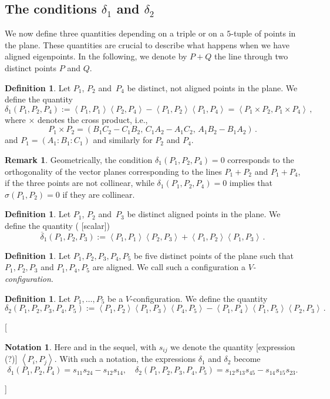 \documentclass{amsart}
\theoremstyle{plain}
\theoremstyle{definition}
\newtheorem{definition}[lemma]{Definition}
\newtheorem*{notation}{Notation}
\newtheorem{rmk}[lemma]{Remark}
\newcommand{\scl}[2]{\left\langle {#1}, {#2} \right\rangle}
\newcommand{\blue}[1]{{\color{blue}  [#1]}}
\begin{document}
\subsection{The conditions $\delta_1$ and $\delta_2$}

We now define three quantities depending on a triple or on a $5$-tuple of points in the plane.
These quantities are crucial to describe what happens when we have aligned eigenpoints.
In the following, we denote by $P + Q$ the line through two distinct points $P$ and $Q$.

\begin{definition}
\label{definition:delta1}
 Let $P_1$, $P_2$ and~$P_4$ be distinct, not aligned points in the plane.
 We define the quantity
 \[
  \delta_1(P_1, P_2, P_4) :=
  \scl{P_1}{P_1} \scl{P_2}{P_4} - \scl{P_1}{P_2}\scl{P_1}{P_4}
  =
  \scl{P_1\times P_2}{P_1 \times P_4} \,,
 \]
 where $\times$ denotes the cross product, i.e.,
 \[
  P_1 \times P_2 = (B_1 C_2 - C_1 B_2, \, C_1 A_2 - A_1 C_2, \, A_1 B_2 - B_1 A_2) \,.
 \]
 and $P_1 = (A_1: B_1: C_1)$ and similarly for $P_2$ and $P_4$.
\end{definition}

\begin{rmk}\label{rmk: significato di delta1}
 Geometrically, the condition $\delta_1(P_1, P_2, P_4) = 0$ corresponds to the orthogonality of the vector planes corresponding to the lines $P_1 + P_2$ and $P_1 + P_4$, if the three points are not collinear, while
 $\delta_1(P_1, P_2, P_4) = 0$ implies that $\sigma (P_1,P_2)=0$ if they are collinear.
\end{rmk}


\begin{definition}
\label{definition:delta1b}
 Let $P_1$, $P_2$ and~$P_3$ be distinct aligned points in the plane.
 We define the quantity (\blue{scalar})
 \[
  \overline{\delta}_1(P_1, P_2, P_3) :=
  \scl{P_1}{P_1} \scl{P_2}{P_3} + \scl{P_1}{P_2}\scl{P_1}{P_3} \,.
  \]
\end{definition}

\begin{definition}
\label{Vconf}
Let $P_1, P_2, P_3, P_4, P_5$ be five distinct points of the plane
such that $P_1, P_2, P_3$ and $P_1, P_4, P_5$ are aligned.
We call such a configuration a \emph{$V$-configuration}.
\end{definition}


\begin{definition}
 Let $P_1, \dots, P_5$ be a $V$-configuration.
We define the quantity
 \[
  \delta_2(P_1, P_2, P_3, P_4, P_5) :=
  \scl{P_1}{P_2} \scl{P_1}{P_3} \scl{P_4}{P_5} -
  \scl{P_1}{P_4} \scl{P_1}{P_5} \scl{P_2}{P_3} \,.
 \]
\end{definition}
\blue{
\begin{notation}
   Here and in the sequel, with $s_{ij}$ we denote the quantity \blue{expression (?)} $\scl{P_i}{P_j}$.
With such a notation, the expressions $\delta_1$ and $\delta_2$ become
$$
\delta_1(P_1, P_2, P_4) = s_{11} s_{24}-s_{12}s_{14},
\quad \delta_2(P_1, P_2, P_3, P_4, P_5) =s_{12}s_{13}s_{45}-s_{14}s_{15} s_{23}.
$$
 \end{notation}
 }
\end{document}
